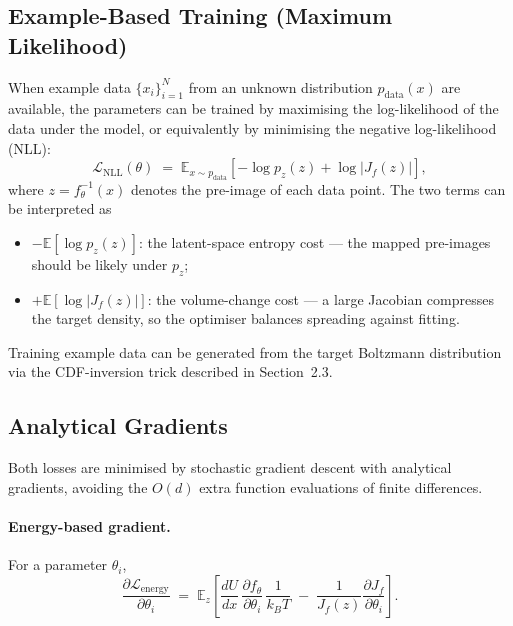 \documentclass[11pt,a4paper]{article}
\newcommand{\E}{\mathbb{E}}
\newcommand{\pz}{p_z}
\newcommand{\ft}{f_{\!\theta}}
\newcommand{\Jf}{J_{\!f}}
\newcommand{\kT}{k_{\!B}T}
\newcommand{\param}{\theta}
\begin{document}
\subsection{Example-Based Training (Maximum Likelihood)}
\label{sec:nll}

When example data $\{x_i\}_{i=1}^N$ from an unknown distribution
$p_{\mathrm{data}}(x)$ are available, the parameters can be trained by
maximising the log-likelihood of the data under the model, or equivalently
by minimising the negative log-likelihood (NLL):
\begin{equation}
  \boxed{
  \mathcal{L}_{\text{NLL}}(\param) \;=\;
  \E_{x\sim p_{\mathrm{data}}}\!\left[-\log\pz(z) + \log|\Jf(z)|\right],
  }
  \label{eq:nll_loss}
\end{equation}
where $z = \ft^{-1}(x)$ denotes the pre-image of each data point.  The
two terms can be interpreted as
\begin{itemize}
  \item $-\E[\log\pz(z)]$: the latent-space entropy cost — the mapped
        pre-images should be likely under $\pz$;
  \item $+\E[\log|\Jf(z)|]$: the volume-change cost — a large Jacobian
        compresses the target density, so the optimiser
        balances spreading against fitting.
\end{itemize}
Training example data can be generated from the target Boltzmann
distribution via the CDF-inversion trick described in Section~2.3.

\subsection{Analytical Gradients}

Both losses are minimised by stochastic gradient descent with analytical
gradients, avoiding the $O(d)$ extra function evaluations of finite
differences.

\paragraph{Energy-based gradient.}
For a parameter $\param_i$,
\begin{equation}
  \frac{\partial\mathcal{L}_{\text{energy}}}{\partial\param_i}
  \;=\;
  \E_z\!\left[\frac{dU}{dx}\,\frac{\partial\ft}{\partial\param_i}\,\frac{1}{\kT}
              \;-\;
              \frac{1}{\Jf(z)}\frac{\partial\Jf}{\partial\param_i}\right].
\end{equation}
\end{document}
